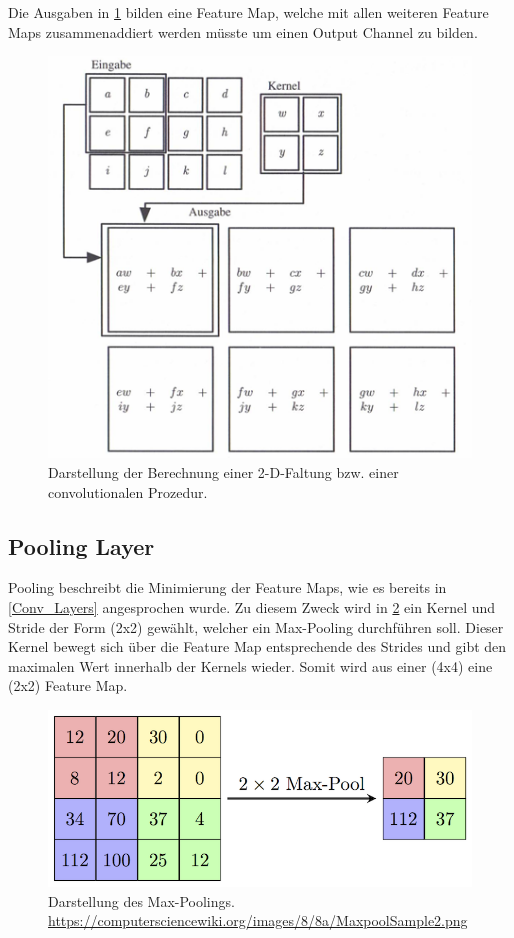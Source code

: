 Die Ausgaben in \ref{fig:Conv2d} bilden eine Feature Map, welche mit allen weiteren Feature Maps zusammenaddiert werden müsste um einen Output Channel zu bilden.
\begin{figure}[H]
	\centering
	\includegraphics[scale=0.69]{Abbildungen/Anhang/Conv.png}
	\caption[Darstellung Convolutional Computation]{Darstellung der Berechnung einer 2-D-Faltung bzw. einer convolutionalen Prozedur. \cite[S. 373]{DL}}
	\label{fig:Conv2d}
\end{figure}

\subsection{Pooling Layer} \label{Pooling_Layer}
Pooling beschreibt die Minimierung der Feature Maps, wie es bereits in \ref{Conv_Layers} angesprochen wurde. Zu diesem Zweck wird in \ref{fig:Maxpool} ein Kernel und Stride der Form (2x2) gewählt, welcher ein Max-Pooling durchführen soll. Dieser Kernel bewegt sich über die Feature Map entsprechende des Strides und gibt den maximalen Wert innerhalb der Kernels wieder. Somit wird aus einer (4x4) eine (2x2) Feature Map. \cite[S. 379 ff.]{DL}

\begin{figure}[H]
	\centering
	\includegraphics[scale=1.7]{Abbildungen/Anhang/Maxpool.png}
	\caption[Darstellung MaxPooling]{Darstellung des Max-Poolings. \url{https://computersciencewiki.org/images/8/8a/MaxpoolSample2.png}}
	\label{fig:Maxpool}
\end{figure}

